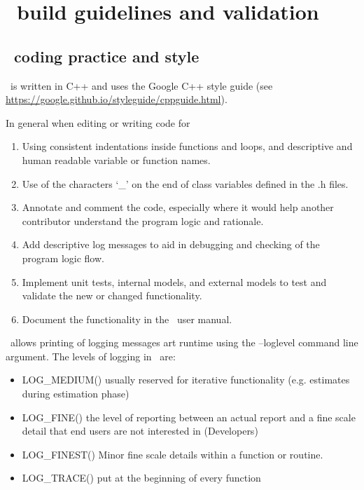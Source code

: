 \section{\CNAME\ build guidelines and validation\label{sec:buildrules}}

\subsection{\CNAME\ coding practice and style}\label{subsec:codepractice}

\CNAME\ is written in C++ and uses the Google C++ style guide (see \url{https://google.github.io/styleguide/cppguide.html}). 

In general when editing or writing code for \CNAME\:

\begin{enumerate}
  \item Using consistent indentations inside functions and loops, and descriptive and human readable variable or function names.
  \item Use of the characters `\_' on the end of class variables defined in the .h files. 
  \item Annotate and comment the code, especially where it would help another contributor understand the program logic and rationale.
  \item Add descriptive log messages to aid in debugging and checking of the program logic flow.
  \item Implement unit tests, internal models, and external models to test and validate the new or changed functionality.
  \item Document the functionality in the \CNAME\ user manual.
\end{enumerate}

\CNAME\ allows printing of logging messages art runtime using the --loglevel command line argument. The levels of logging in \CNAME\ are:

\begin{itemize}
	\item LOG\_MEDIUM()  usually reserved for iterative functionality (e.g. estimates during estimation phase)
	\item LOG\_FINE() the level of reporting between an actual report and a fine scale detail that end users are not interested in (Developers)
	\item LOG\_FINEST() Minor fine scale details within a function or routine.
	\item LOG\_TRACE() put at the beginning of every function
\end{itemize}

